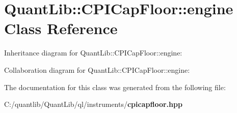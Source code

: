 \section{Quant\+Lib\+:\+:C\+P\+I\+Cap\+Floor\+:\+:engine Class Reference}
\label{class_quant_lib_1_1_c_p_i_cap_floor_1_1engine}


Inheritance diagram for Quant\+Lib\+:\+:C\+P\+I\+Cap\+Floor\+:\+:engine\+:


Collaboration diagram for Quant\+Lib\+:\+:C\+P\+I\+Cap\+Floor\+:\+:engine\+:


The documentation for this class was generated from the following file\+:\begin{DoxyCompactItemize}
\item 
C\+:/quantlib/\+Quant\+Lib/ql/instruments/{\bf cpicapfloor.\+hpp}\end{DoxyCompactItemize}
